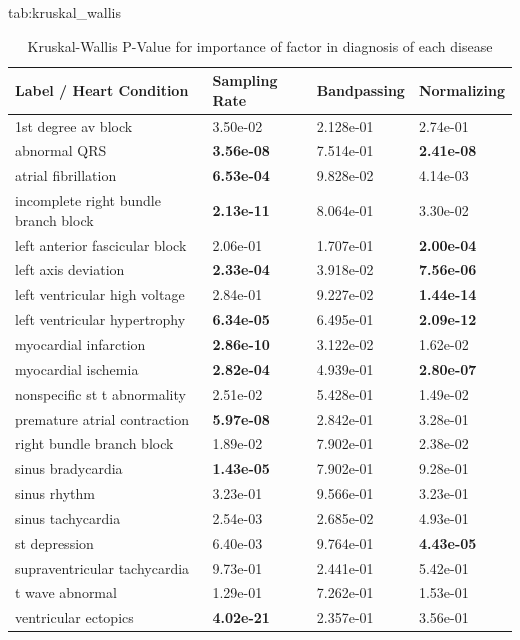 \documentclass[pmlr,twocolumn]{jmlr}%
\begin{document}
\begin{table}[!h]
\floatconts
  {tab:kruskal_wallis}
  {\caption{Kruskal-Wallis P-Value for importance of factor in diagnosis of each disease }}
  {
        \begin{tabular}{|l|l|l|l|}
        \hline
        Label / Heart Condition &             Sampling Rate & Bandpassing & Normalizing\\\hline
1st degree av block                  &  3.50e-02  & 2.128e-01 & 2.74e-01  \\
abnormal QRS                         &  \textbf{3.56e-08}  & 7.514e-01 & \textbf{2.41e-08} \\
atrial fibrillation                  &  \textbf{6.53e-04}  & 9.828e-02 & 4.14e-03   \\
incomplete right bundle branch block &  \textbf{2.13e-11}  & 8.064e-01 & 3.30e-02   \\
left anterior fascicular block       &  2.06e-01  & 1.707e-01 & \textbf{2.00e-04}    \\
left axis deviation                  &  \textbf{2.33e-04}  & 3.918e-02 & \textbf{7.56e-06}   \\
left ventricular high voltage        &  2.84e-01  & 9.227e-02 & \textbf{1.44e-14}    \\
left ventricular hypertrophy         &  \textbf{6.34e-05}  & 6.495e-01  & \textbf{2.09e-12}   \\
myocardial infarction                &  \textbf{2.86e-10}  & 3.122e-02  & 1.62e-02  \\
myocardial ischemia                  &  \textbf{2.82e-04}  & 4.939e-01  & \textbf{2.80e-07}  \\
nonspecific st t abnormality         &  2.51e-02  & 5.428e-01 & 1.49e-02  \\
premature atrial contraction         &  \textbf{5.97e-08}  & 2.842e-01 & 3.28e-01  \\
right bundle branch block            &  1.89e-02  & 7.902e-01 & 2.38e-02  \\
sinus bradycardia                    &  \textbf{1.43e-05}  & 7.902e-01 & 9.28e-01  \\
sinus rhythm                         &  3.23e-01  & 9.566e-01 & 3.23e-01  \\
sinus tachycardia                    &  2.54e-03  & 2.685e-02 & 4.93e-01 \\
st depression                        &  6.40e-03  & 9.764e-01 & \textbf{4.43e-05}  \\
supraventricular tachycardia         &  9.73e-01  & 2.441e-01 & 5.42e-01 \\
t wave abnormal                      &  1.29e-01  & 7.262e-01 & 1.53e-01  \\
ventricular ectopics                 &  \textbf{4.02e-21}  & 2.357e-01 & 3.56e-01 \\\hline
        \end{tabular}
  }
\end{table}
\end{document}
